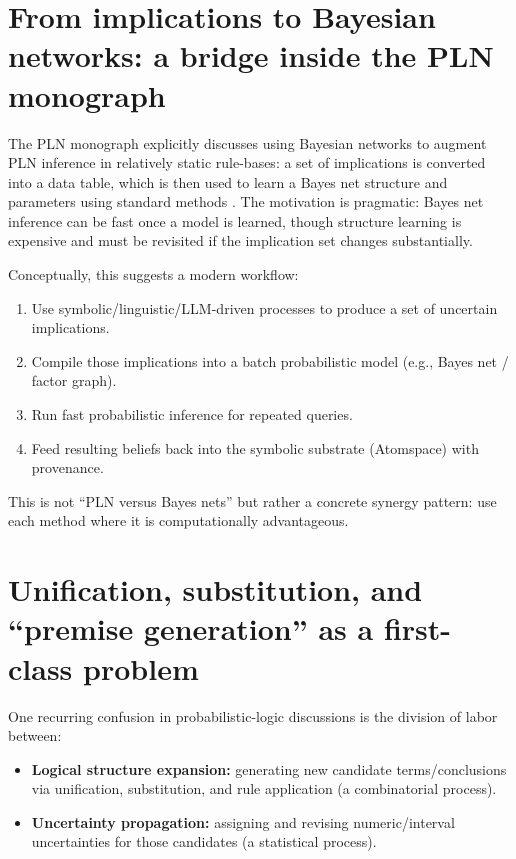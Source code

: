 \documentclass[11pt]{article}
\begin{document}
\section{From implications to Bayesian networks: a bridge inside the PLN monograph}

The PLN monograph explicitly discusses using Bayesian networks to augment PLN inference in
relatively static rule-bases: a set of implications is converted into a data table, which is then used
to learn a Bayes net structure and parameters using standard methods \cite{pln-book}.
The motivation is pragmatic: Bayes net inference can be fast once a model is learned, though structure
learning is expensive and must be revisited if the implication set changes substantially.

Conceptually, this suggests a modern workflow:

\begin{enumerate}[leftmargin=*]
\item Use symbolic/linguistic/LLM-driven processes to produce a set of uncertain implications.
\item Compile those implications into a batch probabilistic model (e.g., Bayes net / factor graph).
\item Run fast probabilistic inference for repeated queries.
\item Feed resulting beliefs back into the symbolic substrate (Atomspace) with provenance.
\end{enumerate}

This is not ``PLN versus Bayes nets'' but rather a concrete synergy pattern: use each method where
it is computationally advantageous.

\section{Unification, substitution, and ``premise generation'' as a first-class problem}

One recurring confusion in probabilistic-logic discussions is the division of labor between:

\begin{itemize}[leftmargin=*]
\item \textbf{Logical structure expansion:} generating new candidate terms/conclusions via unification,
substitution, and rule application (a combinatorial process).
\item \textbf{Uncertainty propagation:} assigning and revising numeric/interval uncertainties for those
candidates (a statistical process).
\end{itemize}
\end{document}
